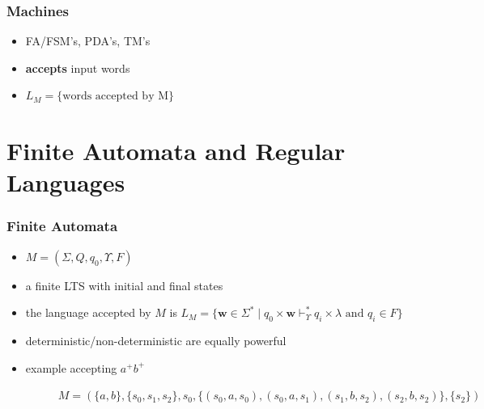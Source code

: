 \documentclass{beamer}
\begin{document}

\begin{frame}
\frametitle{Machines}
\begin{itemize}
  \item FA/FSM's, PDA's, TM's
  \item \textbf{accepts} input words
  \item $L_M = \{\text{words accepted by M}\}$
\end{itemize}
\end{frame}

\section{Finite Automata and Regular Languages}

\begin{frame}
\frametitle{Finite Automata}
\begin{itemize}
\item $M = (\Sigma, Q, q_0, \Upsilon, F)$
\item a finite LTS with initial and final states
\item the language accepted by $M$ is $L_M = \{\mathbf{w} \in \Sigma^* \; | \; q_0 \times
  \mathbf{w} \vdash_{\Upsilon}^* q_i \times \lambda \text{ and } q_i \in F\}$
\item deterministic/non-deterministic are equally powerful
\item example accepting $a^+b^+$
\begin{figure}
  \centering
{}
\caption{$M = (\{a, b\}, \{s_0, s_1, s_2\}, s_0, \{(s_0, a, s_0), (s_0, a, s_1),
  (s_1, b, s_2), (s_2, b, s_2)\}, \{s_2\})$}
\end{figure}
\end{itemize}
\end{frame}
\end{document}
